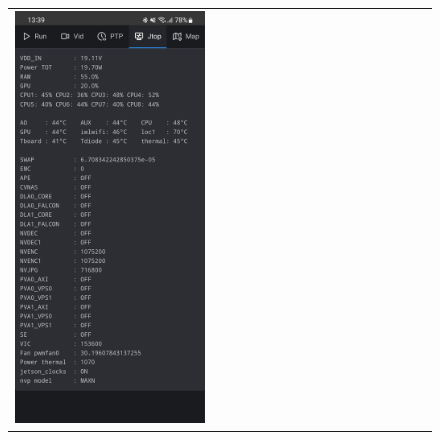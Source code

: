 \begin{figure}[H]
\begin{tabular}[b]{lr}
{            \label{fig:gui_jtop}}{\includegraphics[width=0.48\textwidth]{figures/gui/jtop.jpg}}
    \end{tabular}
    \caption{}
\end{figure}